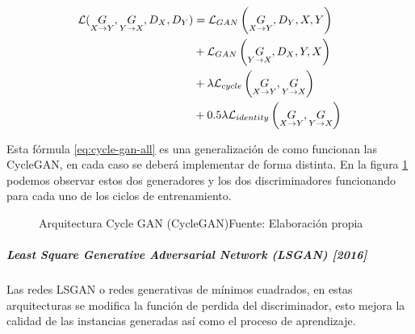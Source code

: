 \begin{equation}
    \begin{split}
        \mathcal{L} (\underset{X\rightarrow{}Y}{G}, \underset{Y\rightarrow{}X}{G}, D_{X}, D_{Y})
        & =            \mathcal{L}_{GAN}       \left(\underset{X\rightarrow{}Y}{G}, D_{Y}, X, Y \right) \\
        & +            \mathcal{L}_{GAN}       \left(\underset{Y\rightarrow{}X}{G}, D_{X}, Y, X \right) \\
        & + \lambda    \mathcal{L}_{cycle}     \left(\underset{X\rightarrow{}Y}{G},\underset{Y\rightarrow{}X}{G}     \right) \\
        & + 0.5\lambda \mathcal{L}_{identity}  \left(\underset{X\rightarrow{}Y}{G},\underset{Y\rightarrow{}X}{G}     \right)
    \end{split}
    \label{eq:cycle-gan-all}
\end{equation}

Esta fórmula \ref{eq:cycle-gan-all} es una generalización de como funcionan las \gls{CycleGAN}, en cada caso se deberá implementar de forma distinta. En la figura \ref{fig:CycleGAN-2} podemos observar estos dos generadores y los dos discriminadores funcionando para cada uno de los ciclos de entrenamiento.


\begin{figure}[H]
    \centering
    \centerline{}
    \caption{Arquitectura Cycle GAN (CycleGAN)\newline{}Fuente: Elaboración propia}
    \label{fig:CycleGAN-2}
\end{figure}




\subparagraph*{Least Square Generative Adversarial Network (LSGAN) [2016]}
Las redes \gls{LSGAN} \cite{LSGAN-mao2017squares} o redes generativas de mínimos cuadrados, en estas arquitecturas se modifica la función de perdida del discriminador, esto mejora la calidad de las instancias generadas así como el proceso de aprendizaje.

